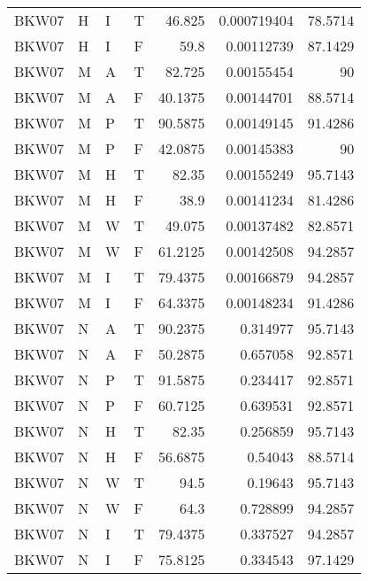\begin{longtable}{llllrrr}
    BKW07    & H     & I     & T          & 46.825     & 0.000719404 & 78.5714  \\
    BKW07    & H     & I     & F          & 59.8       & 0.00112739  & 87.1429  \\
    BKW07    & M     & A     & T          & 82.725     & 0.00155454  & 90       \\
    BKW07    & M     & A     & F          & 40.1375    & 0.00144701  & 88.5714  \\
    BKW07    & M     & P     & T          & 90.5875    & 0.00149145  & 91.4286  \\
    BKW07    & M     & P     & F          & 42.0875    & 0.00145383  & 90       \\
    BKW07    & M     & H     & T          & 82.35      & 0.00155249  & 95.7143  \\
    BKW07    & M     & H     & F          & 38.9       & 0.00141234  & 81.4286  \\
    BKW07    & M     & W     & T          & 49.075     & 0.00137482  & 82.8571  \\
    BKW07    & M     & W     & F          & 61.2125    & 0.00142508  & 94.2857  \\
    BKW07    & M     & I     & T          & 79.4375    & 0.00166879  & 94.2857  \\
    BKW07    & M     & I     & F          & 64.3375    & 0.00148234  & 91.4286  \\
    BKW07    & N     & A     & T          & 90.2375    & 0.314977    & 95.7143  \\
    BKW07    & N     & A     & F          & 50.2875    & 0.657058    & 92.8571  \\
    BKW07    & N     & P     & T          & 91.5875    & 0.234417    & 92.8571  \\
    BKW07    & N     & P     & F          & 60.7125    & 0.639531    & 92.8571  \\
    BKW07    & N     & H     & T          & 82.35      & 0.256859    & 95.7143  \\
    BKW07    & N     & H     & F          & 56.6875    & 0.54043     & 88.5714  \\
    BKW07    & N     & W     & T          & 94.5       & 0.19643     & 95.7143  \\
    BKW07    & N     & W     & F          & 64.3       & 0.728899    & 94.2857  \\
    BKW07    & N     & I     & T          & 79.4375    & 0.337527    & 94.2857  \\
    BKW07    & N     & I     & F          & 75.8125    & 0.334543    & 97.1429  \\

\end{longtable}
